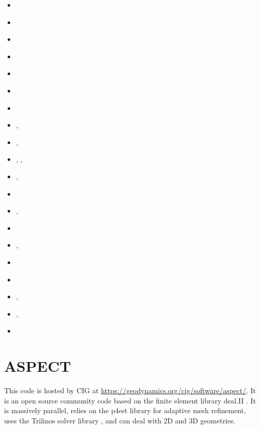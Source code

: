 \begin{small}
\begin{itemize}
\item[\nineteenninetysix] \textcite{hach96b}
\item[\nineteenninetyseven] \textcite{hajc97}
\item[\nineteenninetyeight] \textcite{huhc98}
\item[\nineteenninetynine] \textcite{vajh99}
\item[\twothousand] \textcite{lecd00}
\item[\twothousandone] \textcite{chzh01}
\item[\twothousandthree] \textcite{prch03}
\item[\twothousandfour] \textcite{gocl04}, \textcite{bejh04}
\item[\twothousandsix] \textcite{vech06}, \textcite{golc06}
\item[\twothousandeight] \textcite{boht08a,boht08b}, \textcite{gomm08}, \textcite{netv08}
\item[\twothousandtwelve] \textcite{gech12}, \textcite{gigh12}
\item[\twothousandthirteen] \textcite{wahd13}
\item[\twothousandfourteen] \textcite{cehg14}, \textcite{mehn14}
\item[\twothousandfifteen] \textcite{ceag15}
\item[\twothousandeighteen] \textcite{cegm18}, \textcite{gehn18}
\item[\twothousandnineteen] \textcite{tamg19}
\item[\twothousandtwenty] \textcite{cear20}
\item[\twothousandtwentyone] \textcite{siht21}, \textcite{ceha21} 
\item[\twothousandtwentytwo] \textcite{gefp22}, \textcite{gefp22} 
\item[\twothousandtwentythree] \textcite{matv23}
\end{itemize}
\end{small}

\section{ASPECT} 

This code is hosted by CIG at \url{https://geodynamics.org/cig/software/aspect/}. 
It is an open source community code based on the finite element library deal.II \cite{bahk07,arbc19,arbd20}. 
It is massively parallel, relies on the p4est library for adaptive mesh refinement,
uses the Trilinos solver library \cite{hewi12}, and can deal with 2D and 3D geometries. 

